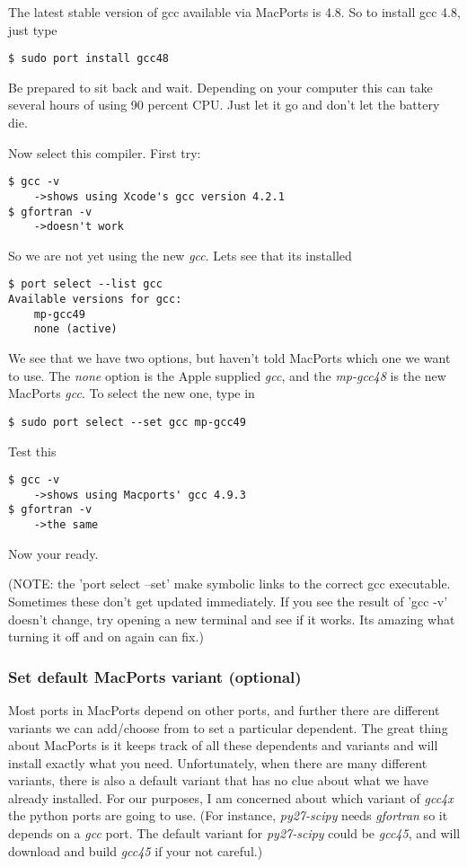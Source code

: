 \documentclass[11pt]{article}
\begin{document}
The latest stable version of gcc available via MacPorts is 4.8. So to install gcc 4.8, just type
\begin{lstlisting}[style=Bash]
$ sudo port install gcc48
\end{lstlisting}
Be prepared to sit back and wait. Depending on your computer this can take several hours of using 90 percent CPU. Just let it go and don't let the battery die.

Now select this compiler. First try:
\begin{lstlisting}[style=Bash]
$ gcc -v
    ->shows using Xcode's gcc version 4.2.1
$ gfortran -v 
    ->doesn't work
\end{lstlisting}
So we are not yet using the new \textit{gcc}. Lets see that its installed
\begin{lstlisting}[style=Bash]
$ port select --list gcc
Available versions for gcc:
	mp-gcc49
	none (active)
\end{lstlisting}
We see that we have two options, but haven't told MacPorts which one we want to use. The \textit{none} option is the Apple supplied \textit{gcc}, and the \textit{mp-gcc48} is the new MacPorts \textit{gcc}. To select the new one, type in
\begin{lstlisting}[style=Bash]
$ sudo port select --set gcc mp-gcc49
\end{lstlisting}
Test this
\begin{lstlisting}[style=Bash]
$ gcc -v
    ->shows using Macports' gcc 4.9.3
$ gfortran -v
    ->the same
\end{lstlisting}
Now your ready. 

(NOTE: the 'port select --set' make symbolic links to the correct gcc executable. Sometimes these don't get updated immediately. If you see the result of 'gcc -v' doesn't change, try opening a new terminal and see if it works. Its amazing what turning it off and on again can fix.)


\subsubsection{Set default MacPorts variant (optional)}
Most ports in MacPorts depend on other ports, and further there are different variants we can add/choose from to set a particular dependent. The great thing about MacPorts is it keeps track of all these dependents and variants and will install exactly what you need. Unfortunately, when there are many different variants, there is also a default variant that has no clue about what we have already installed. For our purposes, I am concerned about which variant of \textit{gcc4x} the python ports are going to use. (For instance, \textit{py27-scipy} needs \textit{gfortran} so it depends on a \textit{gcc} port. The default variant for \textit{py27-scipy} could be \textit{gcc45}, and will download and build \textit{gcc45} if your not careful.)
\end{document}
